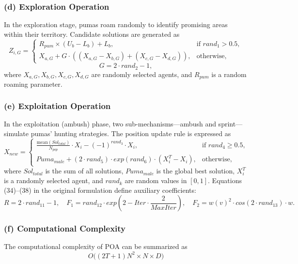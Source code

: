 \documentclass[a4paper,12pt]{article}
\begin{document}
\subsubsection*{(d) Exploration Operation}
In the exploration stage, pumas roam randomly to identify promising areas within their territory. Candidate solutions are generated as
\begin{equation}
Z_{i,G} =
\begin{cases}
R_{pum} \times (U_b - L_b) + L_b, & \text{if } rand_1 > 0.5, \\
X_{a,G} + G \cdot ((X_{a,G} - X_{b,G}) + (X_{c,G} - X_{d,G})), & \text{otherwise,}
\end{cases}
\end{equation}
\begin{equation}
G = 2 \cdot rand_2 - 1,
\end{equation}
where $X_{a,G}, X_{b,G}, X_{c,G}, X_{d,G}$ are randomly selected agents, and $R_{pum}$ is a random roaming parameter.

\subsubsection*{(e) Exploitation Operation}
In the exploitation (ambush) phase, two sub-mechanisms—ambush and sprint—simulate pumas’ hunting strategies. The position update rule is expressed as
\begin{equation}
X_{new} =
\begin{cases}
\frac{\text{mean}(Sol_{total})}{N_{pop}} \cdot X_i - (-1)^{rand_3} \cdot X_i, & \text{if } rand_4 \geq 0.5,\\
Puma_{male} + (2 \cdot rand_5) \cdot exp(rand_6) \cdot (X^T_i - X_i), & \text{otherwise,}
\end{cases}
\end{equation}
where $Sol_{total}$ is the sum of all solutions, $Puma_{male}$ is the global best solution, $X^T_i$ is a randomly selected agent, and $rand_k$ are random values in $[0,1]$. Equations (34)--(38) in the original formulation define auxiliary coefficients:
\begin{equation}
R = 2 \cdot rand_{11} - 1, \quad
F_1 = rand_{12} \cdot exp\left(2 - Iter \cdot \frac{2}{MaxIter}\right), \quad
F_2 = w (v)^2 \cdot cos(2 \cdot rand_{13}) \cdot w.
\end{equation}

\subsubsection*{(f) Computational Complexity}
The computational complexity of POA can be summarized as
\begin{equation}
O\big((2T + 1)N^2 \times N \times D\big)
\end{equation}
\end{document}
